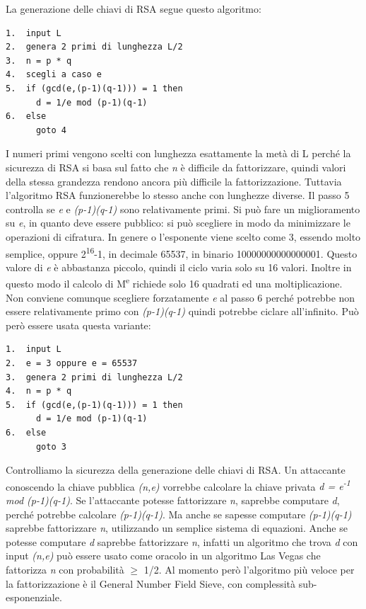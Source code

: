 La generazione delle chiavi di RSA segue questo algoritmo:
\begin{lstlisting}
1.  input L
2.  genera 2 primi di lunghezza L/2
3.  n = p * q
4.  scegli a caso e 
5.  if (gcd(e,(p-1)(q-1))) = 1 then
      d = 1/e mod (p-1)(q-1)
6.  else
      goto 4
\end{lstlisting}
I numeri primi vengono scelti con lunghezza esattamente la metà di L perché la sicurezza di RSA si basa sul fatto che \textit{n} è difficile da fattorizzare, quindi valori della stessa grandezza rendono ancora più difficile la fattorizzazione. Tuttavia l'algoritmo RSA funzionerebbe lo stesso anche con lunghezze diverse. Il passo 5 controlla se \textit{e} e \textit{(p-1)(q-1)} sono relativamente primi. Si può fare un miglioramento su \textit{e}, in quanto deve essere pubblico: si può scegliere in modo da minimizzare le operazioni di cifratura. In genere o l'esponente viene scelto come 3, essendo molto semplice, oppure 2\textsuperscript{16}-1, in decimale 65537, in binario 10000000000000001. Questo valore di \textit{e} è abbastanza piccolo, quindi il ciclo varia solo su 16 valori. Inoltre in questo modo il calcolo di M\textsuperscript{e} richiede solo 16 quadrati ed una moltiplicazione. Non conviene comunque scegliere forzatamente \textit{e} al passo 6 perché potrebbe non essere relativamente primo con \textit{(p-1)(q-1)} quindi potrebbe ciclare all'infinito. Può però essere usata questa variante:
\begin{lstlisting}
1.  input L
2.  e = 3 oppure e = 65537
3.  genera 2 primi di lunghezza L/2
4.  n = p * q
5.  if (gcd(e,(p-1)(q-1))) = 1 then
      d = 1/e mod (p-1)(q-1)
6.  else
      goto 3
\end{lstlisting}
Controlliamo la sicurezza della generazione delle chiavi di RSA. Un attaccante conoscendo la chiave pubblica \textit{(n,e)} vorrebbe calcolare la chiave privata \textit{d = e\textsuperscript{-1} mod (p-1)(q-1)}. Se l'attaccante potesse fattorizzare \textit{n}, saprebbe computare \textit{d}, perché potrebbe calcolare \textit{(p-1)(q-1)}. Ma anche se sapesse computare \textit{(p-1)(q-1)} saprebbe fattorizzare \textit{n}, utilizzando un semplice sistema di equazioni. Anche se potesse computare \textit{d} saprebbe fattorizzare \textit{n}, infatti un algoritmo che trova \textit{d} con input \textit{(n,e)} può essere usato come oracolo in un algoritmo Las Vegas che fattorizza \textit{n} con probabilità $\geq$ 1/2. Al momento però l'algoritmo più veloce per la fattorizzazione è il General Number Field Sieve, con complessità sub-esponenziale. 

